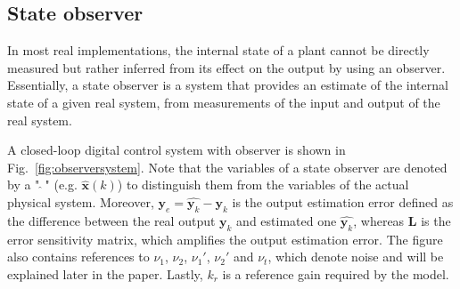 \documentclass[sigconf]{llncs}
\newcommand{\mat}[1]{\boldsymbol{#1}}
\renewcommand{\vec}[1]{\boldsymbol{#1}}
\begin{document}
\subsection{State observer}\label{sec:observer}
In most real implementations, the internal state of a plant cannot be
directly measured but rather inferred from its effect on the output by
using an observer.  Essentially, a state observer is a system that
provides an estimate of the internal state of a given real system,
from measurements of the input and output of the real system.

A closed-loop digital control system with observer is shown in Fig.~\ref{fig:observersystem}.
Note that the variables of a state observer are denoted by a "$~\hat{}~$" (e.g. {$\hat {\vec{x}}(k)$})
  to distinguish them from the variables of the actual physical system.
  Moreover, $\vec{y}_e=\hat{\vec{y}_k}-\vec{y}_k$ is the output estimation error defined
  as the difference between the real output $\vec{y}_k$ and estimated one $\hat{\vec{y}_k}$, whereas
  $\mat{L}$ is the error sensitivity matrix, which amplifies the output estimation error.
  The figure also contains references to $\nu_1$, $\nu_2$, $\nu_1'$, $\nu_2'$ and $\nu_t$, which
  denote noise and will be explained later in the paper.
  Lastly, $k_r$ is a reference gain required by the model.
\end{document}
